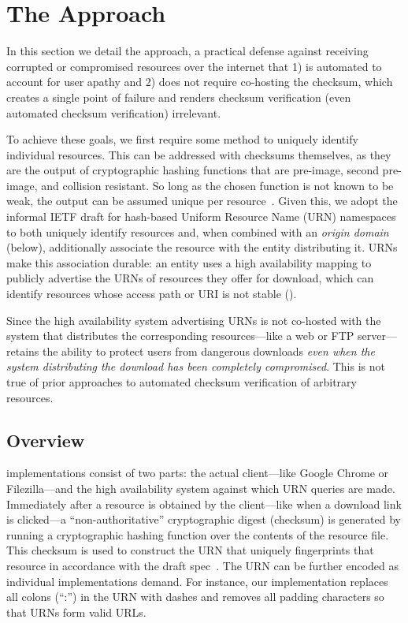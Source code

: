 \section{The \SYSTEM{} Approach} \label{sec:approach}

In this section we detail the \SYSTEM{} approach, a practical defense against
receiving corrupted or compromised resources over the internet that 1) is
automated to account for user apathy and 2) does not require co-hosting the
checksum, which creates a single point of failure and renders checksum
verification (even automated checksum verification) irrelevant.

To achieve these goals, we first require some method to uniquely identify
individual resources. This can be addressed with checksums themselves, as they
are the output of cryptographic hashing functions that are pre-image, second
pre-image, and collision resistant. So long as the chosen function is not known
to be weak, the output can be assumed unique per resource~\cite{Rogaway}. Given
this, we adopt the informal IETF draft for hash-based Uniform Resource Name
(URN) namespaces~\cite{draft-URN} to both uniquely identify resources and, when
combined with an \emph{origin domain} (below), additionally associate the
resource with the entity distributing it. URNs make this association durable: an
entity uses a high availability mapping to publicly advertise the URNs of
resources they offer for download, which can identify resources whose access
path or URI is not stable ().

Since the high availability system advertising URNs is not co-hosted with the
system that distributes the corresponding resources---like a web or FTP
server---\SYSTEM{} retains the ability to protect users from dangerous downloads
\emph{even when the system distributing the download has been completely
compromised}. This is not true of prior approaches to automated checksum
verification of arbitrary resources.

\subsection{Overview}

\SYSTEM{} implementations consist of two parts: the actual client---like Google
Chrome or Filezilla---and the high availability system against which URN queries
are made. Immediately after a resource is obtained by the client---like when a
download link is clicked---a ``non-authoritative'' cryptographic digest
(checksum) is generated by running a cryptographic hashing function over the
contents of the resource file. This checksum is used to construct the URN that
uniquely fingerprints that resource in accordance with the draft
spec~\cite{draft-URN}. The URN can be further encoded as individual
implementations demand. For instance, our \DNSSYS{} implementation replaces all
colons (``:'') in the URN with dashes and removes all padding characters so that
URNs form valid URLs.

